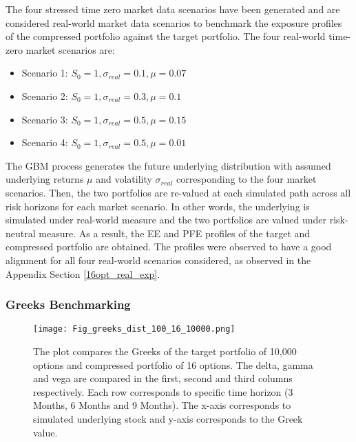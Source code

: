 \noindent The four stressed time zero market data scenarios have been generated and are considered real-world market data scenarios to benchmark the exposure profiles of the compressed portfolio against the target portfolio. The four real-world time-zero market scenarios are:

\begin{itemize}
\item Scenario 1: $S_0 =1 , \sigma_{real}=0.1, \mu=0.07$
\item Scenario 2: $S_0 =1 , \sigma_{real}=0.3, \mu=0.1$
\item Scenario 3: $S_0 =1 , \sigma_{real}=0.5, \mu=0.15$
\item Scenario 4: $S_0 =1 , \sigma_{real}=0.5, \mu=0.01$
\end{itemize}

\noindent The GBM process generates the future underlying distribution with assumed underlying returns $\mu$ and volatility $\sigma_{real}$ corresponding to the four market scenarios. Then, the two portfolios are re-valued at each simulated path across all risk horizons for each market scenario. In other words, the underlying is simulated under real-world measure and the two portfolios are valued under risk-neutral measure. As a result, the EE and PFE profiles of the target and compressed portfolio are obtained.  The profiles were observed to have a good alignment for all four real-world scenarios considered, as observed in the Appendix Section \ref{16opt_real_exp}.


\subsubsection{Greeks Benchmarking}
\begin{figure}[!htbp]
\begin{center}
\texttt{[image: Fig\_greeks\_dist\_100\_16\_10000.png]}
\caption{The plot compares the Greeks of the target portfolio of 10,000 options and compressed portfolio of 16 options. The delta, gamma and vega are compared in the first, second and third columns respectively. Each row corresponds to specific time horizon (3 Months, 6 Months and 9 Months). The x-axis corresponds to simulated underlying stock and y-axis corresponds to the Greek value.} \label{Fig_greeks_dist_100_16_10000.png}
\end{center}
\end{figure}

